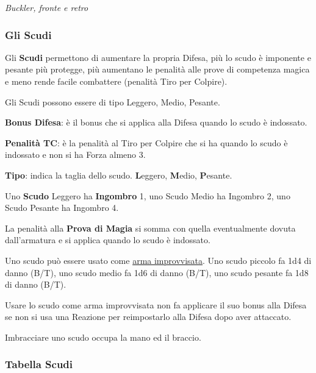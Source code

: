 \begin{multicols}{2}
\begin{center}
\emph{Buckler, fronte e retro}
\end{center}

\subsubsection{Gli Scudi}

Gli \textbf{Scudi} permettono di aumentare la propria Difesa, più lo scudo è imponente e pesante più protegge, più aumentano le penalità alle prove di competenza magica e meno rende facile combattere (penalità Tiro per Colpire).

Gli Scudi possono essere di tipo Leggero, Medio, Pesante.

\textbf{Bonus Difesa}: è il bonus che si applica alla Difesa quando lo scudo è indossato.

\textbf{Penalità TC}: è la penalità al Tiro per Colpire che si ha quando lo scudo è indossato e non si ha Forza almeno 3.

\textbf{Tipo}: indica la taglia dello scudo. \textbf{L}eggero, \textbf{M}edio, \textbf{P}esante.

Uno \textbf{Scudo} Leggero ha \textbf{Ingombro} 1, uno Scudo Medio ha Ingombro 2, uno Scudo Pesante ha Ingombro 4.

La penalità alla \textbf{Prova di Magia} si somma con quella eventualmente dovuta dall'armatura e si applica quando lo scudo è indossato.

Uno scudo può essere usato come \hyperlink{armaimprovvisata}{arma improvvisata}. Uno scudo piccolo fa 1d4 di danno (B/T), uno scudo medio fa 1d6 di danno (B/T), uno scudo pesante fa 1d8 di danno (B/T).

Usare lo scudo come arma improvvisata non fa applicare il suo bonus alla Difesa se non si usa una Reazione per reimpostarlo alla Difesa dopo aver attaccato.

Imbracciare uno scudo occupa la mano ed il braccio.

\end{multicols}


\subsubsection{Tabella Scudi}

\label{tabella-scudi}

